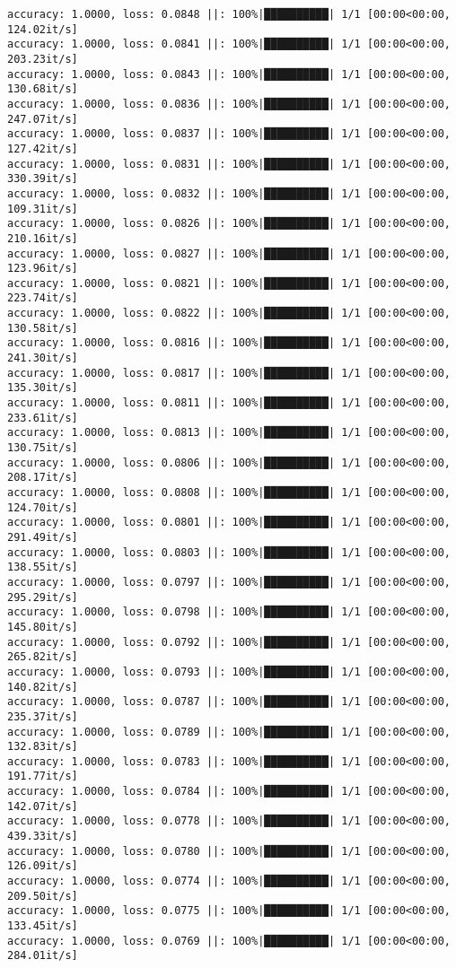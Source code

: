 \documentclass[
]{article}
\begin{document}
\begin{verbatim}
accuracy: 1.0000, loss: 0.0848 ||: 100%|██████████| 1/1 [00:00<00:00, 124.02it/s]
accuracy: 1.0000, loss: 0.0841 ||: 100%|██████████| 1/1 [00:00<00:00, 203.23it/s]
accuracy: 1.0000, loss: 0.0843 ||: 100%|██████████| 1/1 [00:00<00:00, 130.68it/s]
accuracy: 1.0000, loss: 0.0836 ||: 100%|██████████| 1/1 [00:00<00:00, 247.07it/s]
accuracy: 1.0000, loss: 0.0837 ||: 100%|██████████| 1/1 [00:00<00:00, 127.42it/s]
accuracy: 1.0000, loss: 0.0831 ||: 100%|██████████| 1/1 [00:00<00:00, 330.39it/s]
accuracy: 1.0000, loss: 0.0832 ||: 100%|██████████| 1/1 [00:00<00:00, 109.31it/s]
accuracy: 1.0000, loss: 0.0826 ||: 100%|██████████| 1/1 [00:00<00:00, 210.16it/s]
accuracy: 1.0000, loss: 0.0827 ||: 100%|██████████| 1/1 [00:00<00:00, 123.96it/s]
accuracy: 1.0000, loss: 0.0821 ||: 100%|██████████| 1/1 [00:00<00:00, 223.74it/s]
accuracy: 1.0000, loss: 0.0822 ||: 100%|██████████| 1/1 [00:00<00:00, 130.58it/s]
accuracy: 1.0000, loss: 0.0816 ||: 100%|██████████| 1/1 [00:00<00:00, 241.30it/s]
accuracy: 1.0000, loss: 0.0817 ||: 100%|██████████| 1/1 [00:00<00:00, 135.30it/s]
accuracy: 1.0000, loss: 0.0811 ||: 100%|██████████| 1/1 [00:00<00:00, 233.61it/s]
accuracy: 1.0000, loss: 0.0813 ||: 100%|██████████| 1/1 [00:00<00:00, 130.75it/s]
accuracy: 1.0000, loss: 0.0806 ||: 100%|██████████| 1/1 [00:00<00:00, 208.17it/s]
accuracy: 1.0000, loss: 0.0808 ||: 100%|██████████| 1/1 [00:00<00:00, 124.70it/s]
accuracy: 1.0000, loss: 0.0801 ||: 100%|██████████| 1/1 [00:00<00:00, 291.49it/s]
accuracy: 1.0000, loss: 0.0803 ||: 100%|██████████| 1/1 [00:00<00:00, 138.55it/s]
accuracy: 1.0000, loss: 0.0797 ||: 100%|██████████| 1/1 [00:00<00:00, 295.29it/s]
accuracy: 1.0000, loss: 0.0798 ||: 100%|██████████| 1/1 [00:00<00:00, 145.80it/s]
accuracy: 1.0000, loss: 0.0792 ||: 100%|██████████| 1/1 [00:00<00:00, 265.82it/s]
accuracy: 1.0000, loss: 0.0793 ||: 100%|██████████| 1/1 [00:00<00:00, 140.82it/s]
accuracy: 1.0000, loss: 0.0787 ||: 100%|██████████| 1/1 [00:00<00:00, 235.37it/s]
accuracy: 1.0000, loss: 0.0789 ||: 100%|██████████| 1/1 [00:00<00:00, 132.83it/s]
accuracy: 1.0000, loss: 0.0783 ||: 100%|██████████| 1/1 [00:00<00:00, 191.77it/s]
accuracy: 1.0000, loss: 0.0784 ||: 100%|██████████| 1/1 [00:00<00:00, 142.07it/s]
accuracy: 1.0000, loss: 0.0778 ||: 100%|██████████| 1/1 [00:00<00:00, 439.33it/s]
accuracy: 1.0000, loss: 0.0780 ||: 100%|██████████| 1/1 [00:00<00:00, 126.09it/s]
accuracy: 1.0000, loss: 0.0774 ||: 100%|██████████| 1/1 [00:00<00:00, 209.50it/s]
accuracy: 1.0000, loss: 0.0775 ||: 100%|██████████| 1/1 [00:00<00:00, 133.45it/s]
accuracy: 1.0000, loss: 0.0769 ||: 100%|██████████| 1/1 [00:00<00:00, 284.01it/s]

\end{verbatim}
\end{document}
